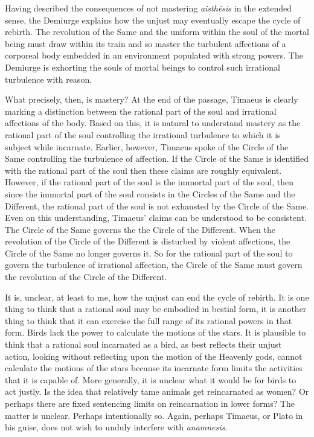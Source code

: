 Having described the consequences of not mastering \emph{aisthēsis} in the extended sense, the Demiurge explains how the unjust may eventually escape the cycle of rebirth. The revolution of the Same and the uniform within the soul of the mortal being must draw within its train and so master the turbulent affections of a corporeal body embedded in an environment populated with strong powers. The Demiurge is exhorting the souls of mortal beings to control such irrational turbulence with reason. 

What precisely, then, is mastery? At the end of the passage, Timaeus is clearly marking a distinction between the rational part of the soul and irrational affections of the body. Based on this, it is natural to understand mastery as the rational part of the soul controlling the irrational turbulence to which it is subject while incarnate. Earlier, however, Timaeus spoke of the Circle of the Same controlling the turbulence of affection. If the Circle of the Same is identified with the rational part of the soul then these claims are roughly equivalent. However, if the rational part of the soul is the immortal part of the soul, then since the immortal part of the soul consists in the Circles of the Same and the Different, the rational part of the soul is not exhausted by the Circle of the Same. Even on this understanding, Timaeus' claims can be understood to be consistent. The Circle of the Same governs the the Circle of the Different. When the revolution of the Circle of the Different is disturbed by violent affections, the Circle of the Same no longer governs it. So for the rational part of the soul to govern the turbulence of irrational affection, the Circle of the Same must govern the revolution of the Circle of the Different.

It is, unclear, at least to me, how the unjust can end the cycle of rebirth. It is one thing to think that a rational soul may be embodied in bestial form, it is another thing to think that it can exercise the full range of its rational powers in that form. Birds lack the power to calculate the motions of the stars. It is plausible to think that a rational soul incarnated as a bird, as best reflects their unjust action, looking without reflecting upon the motion of the Heavenly gods, cannot calculate the motions of the stars because its incarnate form limits the activities that it is capable of. More generally, it is unclear what it would be for birds to act justly. Is the idea that relatively tame animals get reincarnated as women? Or perhaps there are fixed sentencing limits on reincarnation in lower forms? The matter is unclear. Perhaps intentionally so. Again, perhaps Timaeus, or Plato in his guise, does not wish to unduly interfere with \emph{anamnesis}.


